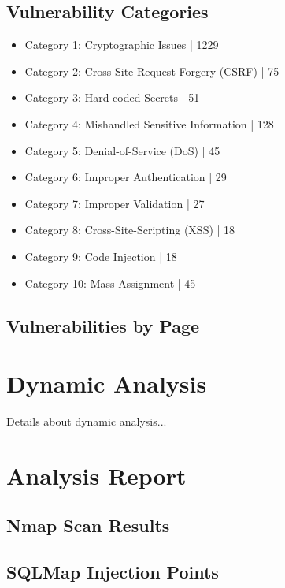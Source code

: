 \documentclass[12pt]{article}
\begin{document}
\subsection{Vulnerability Categories}
\begin{itemize}
\item Category 1: Cryptographic Issues | 1229
\item Category 2: Cross-Site Request Forgery (CSRF) | 75
\item Category 3: Hard-coded Secrets | 51
\item Category 4: Mishandled Sensitive Information | 128
\item Category 5: Denial-of-Service (DoS) | 45
\item Category 6: Improper Authentication | 29
\item Category 7: Improper Validation | 27
\item Category 8: Cross-Site-Scripting (XSS) | 18
\item Category 9: Code Injection | 18
\item Category 10: Mass Assignment | 45

\end{itemize}

\subsection{Vulnerabilities by Page}

\newpage
\section{Dynamic Analysis}
Details about dynamic analysis...

\section{Analysis Report}

\subsection{Nmap Scan Results}

\subsection{SQLMap Injection Points}
\end{document}
